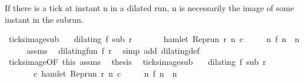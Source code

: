 \begin{isabellebody}
\endisatagproof
{\isafoldproof}%
%
\isadelimproof
%
\endisadelimproof
%
\begin{isamarkuptext}%
If there is a tick at instant n in a dilated run, n is necessarily the image
  of some instant in the subrun.%
\end{isamarkuptext}\isamarkuptrue%
\isamarkupfalse%
\ ticks{\isacharunderscore}image{\isacharunderscore}sub{\isacharcolon}\isanewline
\ \ \ {\isacartoucheopen}dilating\ f\ sub\ r{\isacartoucheclose}\isanewline
\ \ \ \ \ \ \ {\isacartoucheopen}hamlet\ {\isacharparenleft}{\isacharparenleft}Rep{\isacharunderscore}run\ r{\isacharparenright}\ n\ c{\isacharparenright}{\isacartoucheclose}\isanewline
\ \ \ \ \ {\isacartoucheopen}{\isasymexists}n\ f\ n\ {\isacharequal}\ n{\isacartoucheclose}\isanewline
%
\isadelimproof
%
\endisadelimproof
%
\isatagproof
{}\isamarkupfalse%
\ {\isacharminus}\isanewline
\ \ \isamarkupfalse%
\ assms{\isacharparenleft}{}{\isacharparenright}\ \isamarkupfalse%
\ {\isacartoucheopen}dilating{\isacharunderscore}fun\ f\ r{\isacartoucheclose}\ \isamarkupfalse%
\ {\isacharparenleft}simp\ add{\isacharcolon}\ dilating{\isacharunderscore}def{\isacharparenright}\isanewline
\ \ \isamarkupfalse%
\ ticks{\isacharunderscore}image{\isacharbrackleft}OF\ this\ assms{\isacharparenleft}{}{\isacharparenright}{\isacharbrackright}\ \isamarkupfalse%
\ {\isacharquery}thesis\ \isacommand{{\isachardot}}\isamarkupfalse%
\isanewline
{}\isamarkupfalse%
%
\endisatagproof
{\isafoldproof}%
%
\isadelimproof
\isanewline
%
\endisadelimproof
\isanewline
{}\isamarkupfalse%
\ ticks{\isacharunderscore}image{\isacharunderscore}sub{\isacharprime}{\isacharcolon}\isanewline
\ \ \ {\isacartoucheopen}dilating\ f\ sub\ r{\isacartoucheclose}\isanewline
\ \ \ \ \ \ \ {\isacartoucheopen}{\isasymexists}c{\isachardot}\ hamlet\ {\isacharparenleft}{\isacharparenleft}Rep{\isacharunderscore}run\ r{\isacharparenright}\ n\ c{\isacharparenright}{\isacartoucheclose}\isanewline
\ \ \ \ \ {\isacartoucheopen}{\isasymexists}n\ f\ n\ {\isacharequal}\ n{\isacartoucheclose}\isanewline
%
\isadelimproof
%
\endisadelimproof
%
\isatagproof
{}\isamarkupfalse%
\ {\isacharminus}\isanewline
\ \ \isamarkupfalse%

\end{isabellebody}
